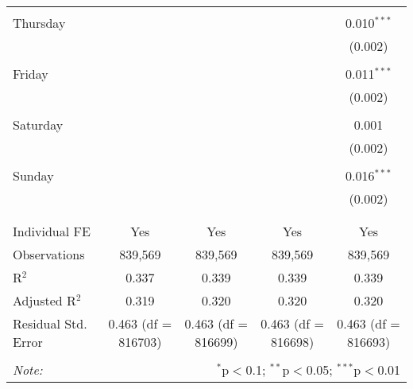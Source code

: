 \documentclass[
]{article}
\begin{document}
\begin{table}[!htbp]
{\begin{tabular}{@{\extracolsep{5pt}}lcccc}
  & & & & \\ 
 Thursday &  &  &  & 0.010$^{***}$ \\ 
  &  &  &  & (0.002) \\ 
  & & & & \\ 
 Friday &  &  &  & 0.011$^{***}$ \\ 
  &  &  &  & (0.002) \\ 
  & & & & \\ 
 Saturday &  &  &  & 0.001 \\ 
  &  &  &  & (0.002) \\ 
  & & & & \\ 
 Sunday &  &  &  & 0.016$^{***}$ \\ 
  &  &  &  & (0.002) \\ 
  & & & & \\ 
\hline \\[-1.8ex] 
Individual FE & Yes & Yes & Yes & Yes \\ 
Observations & 839,569 & 839,569 & 839,569 & 839,569 \\ 
R$^{2}$ & 0.337 & 0.339 & 0.339 & 0.339 \\ 
Adjusted R$^{2}$ & 0.319 & 0.320 & 0.320 & 0.320 \\ 
Residual Std. Error & 0.463 (df = 816703) & 0.463 (df = 816699) & 0.463 (df = 816698) & 0.463 (df = 816693) \\ 
\hline 
\hline \\[-1.8ex] 
\textit{Note:}  & \multicolumn{4}{r}{$^{*}$p$<$0.1; $^{**}$p$<$0.05; $^{***}$p$<$0.01} \\ 
\end{tabular}
} 
\end{table} 
\newpage
\end{document}
